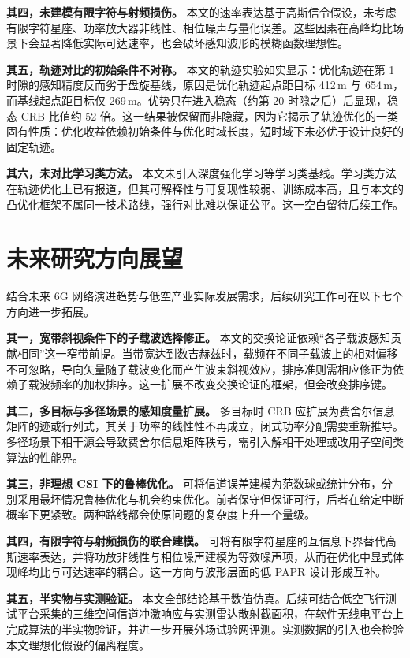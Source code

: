 \textbf{其四，未建模有限字符与射频损伤。} 本文的速率表达基于高斯信令假设，未考虑有限字符星座、功率放大器非线性、相位噪声与量化误差。这些因素在高峰均比场景下会显著降低实际可达速率，也会破坏感知波形的模糊函数理想性。

\textbf{其五，轨迹对比的初始条件不对称。} 本文的轨迹实验如实显示：优化轨迹在第 1 时隙的感知精度反而劣于盘旋基线，原因是优化轨迹起点距目标 412\,m 与 654\,m，而基线起点距目标仅 269\,m。优势只在进入稳态（约第 20 时隙之后）后显现，稳态 CRB 比值约 52 倍。这一结果被保留而非隐藏，因为它揭示了轨迹优化的一类固有性质：优化收益依赖初始条件与优化时域长度，短时域下未必优于设计良好的固定轨迹。

\textbf{其六，未对比学习类方法。} 本文未引入深度强化学习等学习类基线。学习类方法在轨迹优化上已有报道，但其可解释性与可复现性较弱、训练成本高，且与本文的凸优化框架不属同一技术路线，强行对比难以保证公平。这一空白留待后续工作。

\section{未来研究方向展望}
\label{sec:future}

结合未来 6G 网络演进趋势与低空产业实际发展需求，后续研究工作可在以下七个方向进一步拓展。

\textbf{其一，宽带斜视条件下的子载波选择修正。} 本文的交换论证依赖“各子载波感知贡献相同”这一窄带前提。当带宽达到数吉赫兹时，载频在不同子载波上的相对偏移不可忽略，导向矢量随子载波变化而产生波束斜视效应，排序准则需相应修正为依赖子载波频率的加权排序。这一扩展不改变交换论证的框架，但会改变排序键。

\textbf{其二，多目标与多径场景的感知度量扩展。} 多目标时 CRB 应扩展为费舍尔信息矩阵的迹或行列式，其关于功率的线性性不再成立，闭式功率分配需要重新推导。多径场景下相干源会导致费舍尔信息矩阵秩亏，需引入解相干处理或改用子空间类算法的性能界。

\textbf{其三，非理想 CSI 下的鲁棒优化。} 可将信道误差建模为范数球或统计分布，分别采用最坏情况鲁棒优化与机会约束优化。前者保守但保证可行，后者在给定中断概率下更紧致。两种路线都会使原问题的复杂度上升一个量级。

\textbf{其四，有限字符与射频损伤的联合建模。} 可将有限字符星座的互信息下界替代高斯速率表达，并将功放非线性与相位噪声建模为等效噪声项，从而在优化中显式体现峰均比与可达速率的耦合。这一方向与波形层面的低 PAPR 设计形成互补。

\textbf{其五，半实物与实测验证。} 本文全部结论基于数值仿真。后续可结合低空飞行测试平台采集的三维空间信道冲激响应与实测雷达散射截面积，在软件无线电平台上完成算法的半实物验证，并进一步开展外场试验网评测。实测数据的引入也会检验本文理想化假设的偏离程度。

